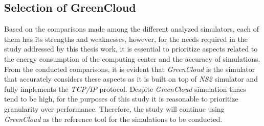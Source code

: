 {\subsection{Selection of GreenCloud}
Based on the comparisons made among the different analyzed simulators, each of them has its strengths and weaknesses, however, for the needs required in the study addressed by this thesis work, it is essential to prioritize aspects related to the energy consumption of the computing center and the accuracy of simulations. From the conducted comparisons, it is evident that \emph{GreenCloud} is the simulator that accurately considers these aspects as it is built on top of \emph{NS2} simulator and fully implements the \emph{TCP/IP} protocol. Despite \emph{GreenCloud} simulation times tend to be high, for the purposes of this study it is reasonable to prioritize granularity over performance. Therefore, the study will continue using \emph{GreenCloud} as the reference tool for the simulations to be conducted.

}


